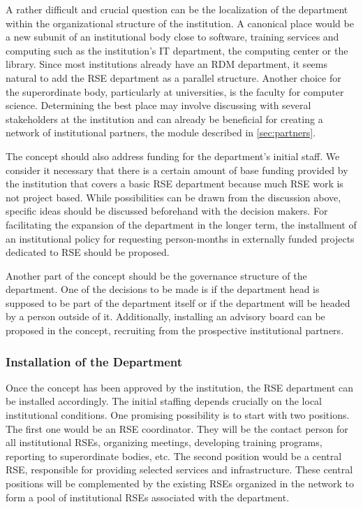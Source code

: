 \documentclass[a4paper]{article}
\begin{document}
A rather difficult and crucial question can be the localization of the department within the organizational structure of the institution.
A canonical place would be a new subunit of an institutional body close to software,
training services and computing such as the institution's IT department, the computing center or the library.
Since most institutions already have an RDM department, it seems natural to add the RSE department as a parallel structure.
Another choice for the superordinate body, particularly at universities, is the faculty for computer science.
Determining the best place may involve discussing with several stakeholders at the institution and can already be beneficial for creating a
network of institutional partners, the module described in \autoref{sec:partners}.

The concept should also address funding for the department's initial staff.
We consider it necessary that there is a certain amount of base funding provided by the institution that covers a basic RSE department because much RSE work is not project based.
While possibilities can be drawn from the discussion above, specific ideas should be discussed beforehand with the decision makers.
For facilitating the expansion of the department in the longer term, the installment of an institutional policy for requesting person-months in externally funded projects dedicated to RSE should be proposed.

Another part of the concept should be the governance structure of the department.
One of the decisions to be made is if the department head is supposed to be part of the department itself or if the department will be headed by a person outside of it.
Additionally, installing an advisory board can be proposed in the concept, recruiting from the prospective institutional partners.

\subsubsection{Installation of the Department}
Once the concept has been approved by the institution, the RSE department can be installed accordingly.
The initial staffing depends crucially on the local institutional conditions. 
One promising possibility is to start with two positions. The first one would be an RSE coordinator.
They will be the contact person for all institutional RSEs, organizing meetings, developing training programs, reporting to superordinate bodies, etc.
The second position would be a central RSE, responsible for providing selected services and infrastructure.
These central positions will be complemented by the existing RSEs organized in the network to form a pool of institutional RSEs associated with the department.
\end{document}
